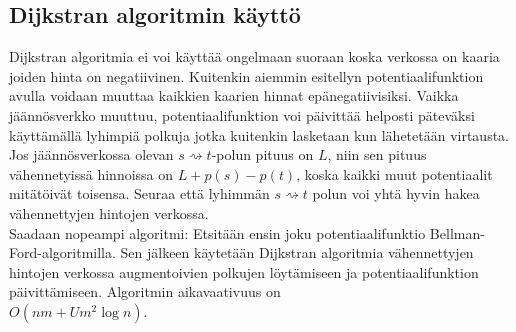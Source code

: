 \documentclass[a4paper, 11pt]{article}
\begin{document}
\subsection*{Dijkstran algoritmin käyttö}
Dijkstran algoritmia ei voi käyttää ongelmaan suoraan koska verkossa on kaaria joiden hinta on
negatiivinen. Kuitenkin aiemmin esitellyn potentiaalifunktion
avulla voidaan muuttaa kaikkien kaarien hinnat epänegatiivisiksi. 
Vaikka jäännösverkko muuttuu, potentiaalifunktion voi päivittää helposti päteväksi
käyttämällä lyhimpiä polkuja jotka kuitenkin lasketaan kun lähetetään virtausta.
Jos jäännösverkossa olevan $s \rightsquigarrow t$-polun pituus on $L$, niin
sen pituus vähennetyissä hinnoissa on $L + p(s) - p(t)$, koska kaikki muut potentiaalit
mitätöivät toisensa. Seuraa että lyhimmän 
$s \rightsquigarrow t$ polun voi yhtä hyvin hakea vähennettyjen hintojen verkossa.\\
Saadaan nopeampi algoritmi: Etsitään ensin joku potentiaalifunktio Bellman-Ford-algoritmilla.
Sen jälkeen käytetään Dijkstran algoritmia vähennettyjen hintojen verkossa augmentoivien polkujen
löytämiseen ja potentiaalifunktion päivittämiseen. Algoritmin aikavaativuus on \\$O(nm + Um^2 \log n)$.
\end{document}
